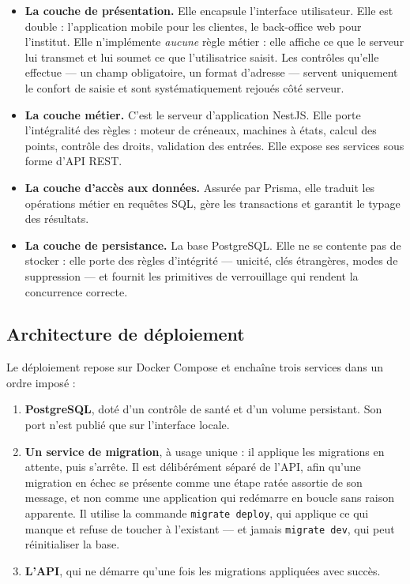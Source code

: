 \begin{itemize}[leftmargin=1.2cm]
  \item \textbf{La couche de présentation.} Elle encapsule l'interface
  utilisateur. Elle est double : l'application mobile pour les clientes, le
  back-office web pour l'institut. Elle n'implémente \emph{aucune} règle
  métier : elle affiche ce que le serveur lui transmet et lui soumet ce que
  l'utilisatrice saisit. Les contrôles qu'elle effectue --- un champ
  obligatoire, un format d'adresse --- servent uniquement le confort de saisie
  et sont systématiquement rejoués côté serveur.

  \item \textbf{La couche métier.} C'est le serveur d'application NestJS. Elle
  porte l'intégralité des règles : moteur de créneaux, machines à états,
  calcul des points, contrôle des droits, validation des entrées. Elle expose
  ses services sous forme d'API REST.

  \item \textbf{La couche d'accès aux données.} Assurée par Prisma, elle
  traduit les opérations métier en requêtes SQL, gère les transactions et
  garantit le typage des résultats.

  \item \textbf{La couche de persistance.} La base PostgreSQL. Elle ne se
  contente pas de stocker : elle porte des règles d'intégrité --- unicité,
  clés étrangères, modes de suppression --- et fournit les primitives de
  verrouillage qui rendent la concurrence correcte.
\end{itemize}

\subsection{Architecture de déploiement}


Le déploiement repose sur Docker Compose et enchaîne trois services dans un
ordre imposé :

\begin{enumerate}[leftmargin=1.2cm]
  \item \textbf{PostgreSQL}, doté d'un contrôle de santé et d'un volume
  persistant. Son port n'est publié que sur l'interface locale.

  \item \textbf{Un service de migration}, à usage unique : il applique les
  migrations en attente, puis s'arrête. Il est délibérément séparé de l'API,
  afin qu'une migration en échec se présente comme une étape ratée assortie de
  son message, et non comme une application qui redémarre en boucle sans
  raison apparente. Il utilise la commande \texttt{migrate deploy}, qui
  applique ce qui manque et refuse de toucher à l'existant --- et jamais
  \texttt{migrate dev}, qui peut réinitialiser la base.

  \item \textbf{L'API}, qui ne démarre qu'une fois les migrations appliquées
  avec succès.
\end{enumerate}

